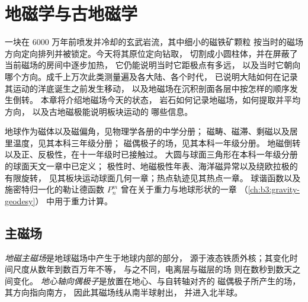 \chapter{地磁学与古地磁学}\label{ch:b3:palaeomagnetism}

一块在 6000 万年前喷发并冷却的玄武岩流，其中细小的磁铁矿颗粒
按当时的磁场方向定向排列并被锁定。今天将其原位定向钻取，
切割成小圆柱体，并在屏蔽了当前磁场的房间中逐步加热，
它仍能说明当时它距极点有多远，
以及当时它朝向哪个方向。成千上万次此类测量遍及各大陆、各个时代，
已说明大陆如何在记录其运动的洋底诞生之前发生移动，
以及地磁场在沉积剖面各层中按怎样的顺序发生倒转。
本章将介绍地磁场今天的状态，
岩石如何记录地磁场，如何提取并平均方向，
以及古地磁极能说明板块运动的
哪些信息。

\begin{recall}
地球作为磁体以及磁偏角，见物理学各册的中学分册；
磁畴、磁滞、剩磁以及居里温度，见其本科三年级分册；
磁偶极子的场，见其本科一年级分册。
地磁倒转以及正、反极性，在十一年级时已接触过。
大圆与球面三角形在本科一年级分册的球面天文一章中已定义；
极性时、地磁极性年表、海洋磁异常以及绕欧拉极的有限旋转，
见其板块运动球面几何一章；热点轨迹见其热点一章。
球谐函数以及施密特归一化的勒让德函数 $P_n^m$
曾在关于重力与地球形状的一章
（\cref{ch:b3:gravity-geodesy}）
中用于重力计算。
\end{recall}

\section{主磁场}

\begin{definition}\label{def:b3:palaeomagnetism:main-field}
\emph{地磁主磁场}是地球磁场中产生于地球内部的部分，
源于液态铁质外核；其变化时间尺度从数年到数百万年不等，
与之不同，电离层与磁层的场
则在数秒到数天之间变化。
\emph{地心轴向偶极子}是放置在地心、与自转轴对齐的
磁偶极子所产生的场，其方向指向南方，
因此其磁场线从南半球射出，
并进入北半球。
\end{definition}

